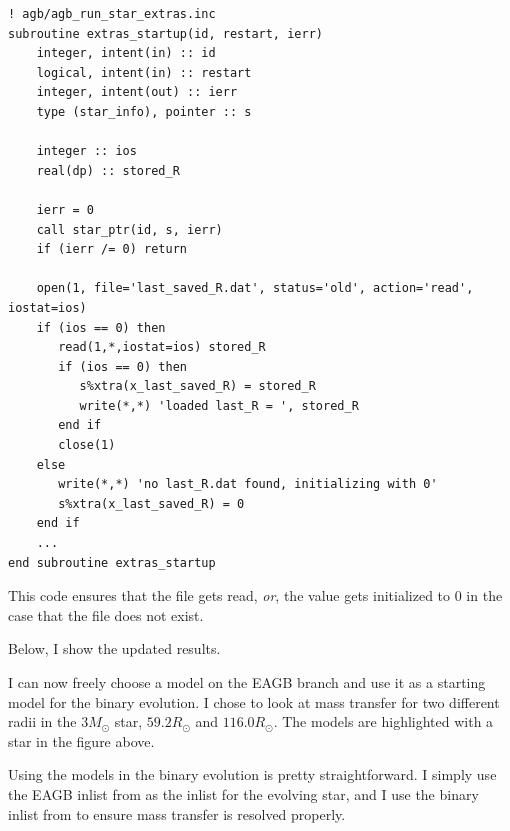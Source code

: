 \documentclass[a4paper,10pt]{article}
\begin{document}
\begin{verbatim}
! agb/agb_run_star_extras.inc
subroutine extras_startup(id, restart, ierr)
    integer, intent(in) :: id
    logical, intent(in) :: restart
    integer, intent(out) :: ierr
    type (star_info), pointer :: s

    integer :: ios
    real(dp) :: stored_R

    ierr = 0
    call star_ptr(id, s, ierr)
    if (ierr /= 0) return

    open(1, file='last_saved_R.dat', status='old', action='read', iostat=ios)
    if (ios == 0) then
       read(1,*,iostat=ios) stored_R
       if (ios == 0) then
          s%xtra(x_last_saved_R) = stored_R
          write(*,*) 'loaded last_R = ', stored_R
       end if
       close(1)
    else
       write(*,*) 'no last_R.dat found, initializing with 0'
       s%xtra(x_last_saved_R) = 0
    end if
    ...
end subroutine extras_startup
\end{verbatim}
This code ensures that the file gets read, \emph{or}, the value gets initialized to \(0\) in the case that the file does not exist.

Below, I show the updated results.

    \begin{figure}[ht]
        \centering
    \end{figure}

I can now freely choose a model on the EAGB branch and use it as a starting model for the binary evolution.
    I chose to look at mass transfer for two different radii in the \(3M_\odot \) star, \(59.2 R_\odot \) and \(116.0R_\odot \). The models are highlighted with a star in the figure above.
    

    Using the models in the binary evolution is pretty straightforward. I simply use the EAGB inlist from \citet{rees2024b} as the inlist for the evolving star, and I use the binary inlist from \citet{temmink2022} to ensure mass transfer is resolved properly.
\end{document}
